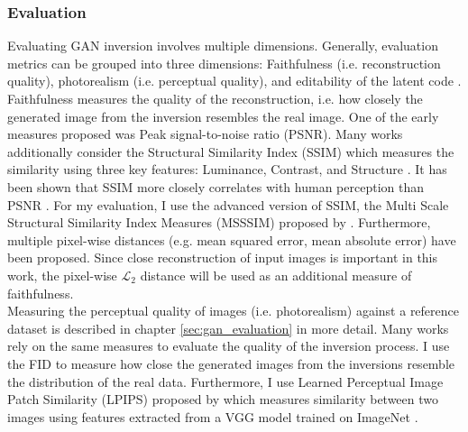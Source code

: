 \subsubsection{Evaluation}
Evaluating GAN inversion involves multiple dimensions. Generally, evaluation metrics can be grouped into three dimensions: Faithfulness (i.e. reconstruction quality), photorealism (i.e. perceptual quality),  and editability of the latent code \citep[p.3]{xia2022gan}. \\
Faithfulness measures the quality of the reconstruction, i.e. how closely the generated image from the inversion resembles the real image. One of the early measures proposed was Peak signal-to-noise ratio (PSNR). Many works additionally consider the Structural Similarity Index (SSIM) \citep{wang2004image} which measures the similarity using three key features: Luminance, Contrast, and Structure \cite[p.6]{wang2004image}. It has been shown that SSIM more closely correlates with human perception than PSNR \cite[p.19]{sheikh2006statistical}. For my evaluation, I use the advanced version of SSIM, the Multi Scale Structural Similarity Index Measures (MSSSIM) proposed by \cite{wang2003multiscale}.  Furthermore, multiple pixel-wise distances (e.g. mean squared error, mean absolute error) have been proposed. Since close reconstruction of input images is important in this work, the pixel-wise $\mathcal{L}_2$ distance will be used as an additional measure of faithfulness. \\
Measuring the perceptual quality of images (i.e. photorealism) against a reference dataset is described in chapter \ref{sec:gan_evaluation} in more detail. Many works rely on the same measures to evaluate the quality of the inversion process. I use the FID \citep{heusel2017gans} to measure how close the generated images from the inversions resemble the distribution of the real data. Furthermore, I use Learned Perceptual Image Patch Similarity (LPIPS) proposed by \cite{zhang2018unreasonable} which measures similarity between two images using features extracted from a VGG model \citep{simonyan2014very} trained on ImageNet \citep{deng2009imagenet}. \\
